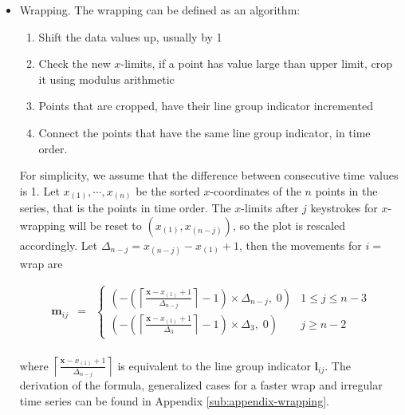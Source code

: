 \documentclass[12pt]{article}
\begin{document}
\begin{itemize} \itemsep 0in

\item Wrapping. The wrapping can be defined as an algorithm:

\begin{enumerate} \itemsep 0in
\item Shift the data values up, usually by 1
\item Check the new $x$-limits, if a point has value large than upper limit, crop it using modulus arithmetic
\item Points that are cropped, have their line group indicator incremented
\item Connect the points that have the same line group indicator, in time order.
\end{enumerate}

For simplicity, we assume that the difference between consecutive
time values is 1. Let $x_{(1)},\cdots,x_{(n)}$ be the sorted
$x$-coordinates of the $n$ points in the series, that is the
points in time order. The $x$-limits after $j$ keystrokes for
$x$-wrapping will be reset to $(x_{(1)}, x_{(n-j)})$, so the
plot is rescaled accordingly. Let $\Delta_{n-j}=x_{(n-j)}-x_{(1)}+1$,
then the movements for $i=$ wrap are

\begin{eqnarray*}
\mathbf{m}{}_{ij} & = & \begin{cases}
(-\left(\left\lceil \frac{\mathbf{x}-x_{(1)}+1}{\Delta_{n-j}}\right\rceil -1\right)\times\Delta_{n-j}, \; 0) & 1\leq j \leq n-3 \\
(-\left(\left\lceil \frac{\mathbf{x}-x_{(1)}+1}{\Delta_3}\right\rceil -1\right)\times\Delta_3, \; 0) & j\ge n-2
\end{cases} \\
\end{eqnarray*}

where $\left\lceil \frac{\mathbf{x}-x_{(1)}+1}{\Delta_{n-j}}\right\rceil$
is equivalent to the line group indicator $\mathbf{l}{}_{ij}$.
The derivation of the formula, generalized cases for a faster
wrap and irregular time series can be found in Appendix
\ref{sub:appendix-wrapping}.


\end{itemize}
\end{document}
